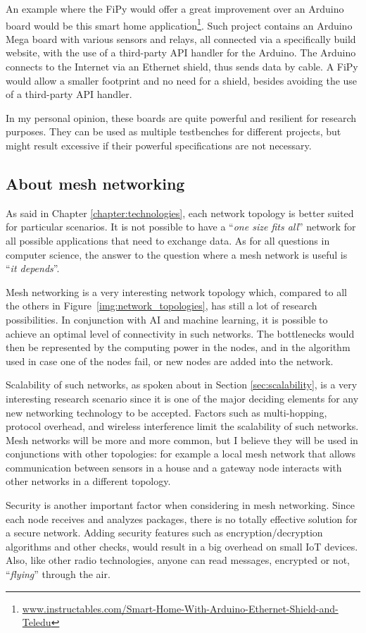 			An example where the FiPy would offer a great improvement over an Arduino board would be this smart home application\footnote{ \url{www.instructables.com/Smart-Home-With-Arduino-Ethernet-Shield-and-Teledu}}.
			Such project contains an Arduino Mega board with various sensors and relays, all connected via a specifically build website, with the use of a third-party API handler for the Arduino.
			The Arduino connects to the Internet via an Ethernet shield, thus sends data by cable.
			A FiPy would allow a smaller footprint and no need for a shield, besides avoiding the use of a third-party API handler.
					
			In my personal opinion, these boards are quite powerful and resilient for research purposes.
			They can be used as multiple testbenches for different projects, but might result excessive if their powerful specifications are not necessary.
			
		\subsection{About mesh networking}\label{sec:mesh_considerations}
			
			As said in Chapter \ref{chapter:technologies}, each network topology is better suited for particular scenarios.
			It is not possible to have a ``\textit{one size fits all}'' network for all possible applications that need to exchange data.
			As for all questions in computer science, the answer to the question where a mesh network is useful is ``\textit{it depends}''.
			
			Mesh networking is a very interesting network topology which, compared to all the others in Figure~\ref{img:network_topologies}, has still a lot of research possibilities.
			In conjunction with AI and machine learning, it is possible to achieve an optimal level of connectivity in such networks.
			The bottlenecks would then be represented by the computing power in the nodes, and in the algorithm used in case one of the nodes fail, or new nodes are added into the network.

			Scalability of such networks, as spoken about in Section \ref{sec:scalability}, is a very interesting research scenario since it is one of the major deciding elements for any new networking technology to be accepted.
			Factors such as multi-hopping, protocol overhead, and wireless interference limit the scalability of such networks.
			Mesh networks will be more and more common, but I believe they will be used in conjunctions with other topologies: for example a local mesh network that allows communication between sensors in a house and a gateway node interacts with other networks in a different topology.
			
			Security is another important factor when considering in mesh networking.
			Since each node receives and analyzes packages, there is no totally effective solution for a secure network.
			Adding security features such as encryption/decryption algorithms and other checks, would result in a big overhead on small IoT devices.
			Also, like other radio technologies, anyone can read messages, encrypted or not, ``\textit{flying}'' through the air.